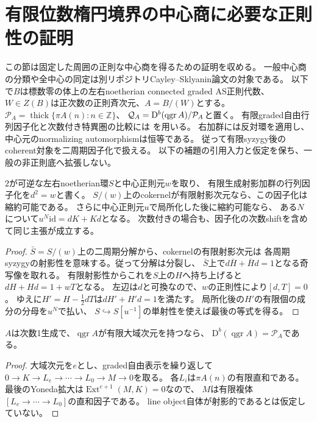 \section{有限位数楕円境界の中心商に必要な正則性の証明}
\label{CSBGsec:pair-finite-order-background}
この節は固定した周囲の正則な中心商を得るための証明を収める。
一般中心商の分類や全中心の同定は別リポジトリCayley--Sklyanin論文の対象である。
以下で$B$は標数零の体上の左右noetherian connected graded AS正則代数、
$W\in Z(B)$は正次数の正則斉次元、$A=B/(W)$とする。
$\mathcal P_A=\operatorname{thick}\{\pi A(n):n\in\mathbb Z\}$、
$\mathcal Q_A=\mathrm D^b(\operatorname{qgr} A)/\mathcal P_A$と置く。
有限graded自由行列因子化と次数付き特異圏の比較には
\cite[Theorems~4.7, 5.5]{CSBGCCKM}を用いる。
右加群には反対環を適用し、中心元のnormalizing automorphismは恒等である。
従って有限syzygy後のcoherent対象を二周期因子化で扱える。
以下の補題の引用入力と仮定を保ち、一般の非正則底へ拡張しない。
\begin{lemma}[有限射影因子化の縮約と分母払い]
\label{CSBGlem:gluing-contraction}
$2$が可逆な左右noetherian環$S$と中心正則元$w$を取り、
有限生成射影加群の行列因子化を$d^2=w$と書く。
$S/(w)$上のcokernelが有限射影次元なら、この因子化は縮約可能である。
さらに中心正則元$u$で局所化した後に縮約可能なら、
ある$N$について$u^N\mathrm{id}=dK+Kd$となる。
次数付きの場合も、因子化の次数shiftを含めて同じ主張が成立する。
\end{lemma}
\begin{proof}
$\bar S=S/(w)$上の二周期分解から、cokernelの有限射影次元は
各周期syzygyの射影性を意味する。従って分解は分裂し、
$\bar S$上で$d\bar H+\bar Hd=1$となる奇写像を取れる。
有限射影性からこれを$S$上の$H$へ持ち上げると
$dH+Hd=1+wT$となる。
左辺は$d$と可換なので、$w$の正則性により$[d,T]=0$。
ゆえに$H'=H-\frac12dT$は$dH'+H'd=1$を満たす。
局所化後の$H'$の有限個の成分の分母を$u^N$で払い、
$S\hookrightarrow S[u^{-1}]$の単射性を使えば最後の等式を得る。
\end{proof}

\begin{lemma}[有限大域次元からtwistsによる生成へ]
\label{CSBGlem:global-finite-to-perfect}
$A$は次数1生成で、$\operatorname{qgr}A$が有限大域次元を持つなら、
$\mathrm D^b(\operatorname{qgr}A)=\mathcal P_A$である。
\end{lemma}
\begin{proof}
大域次元を$e$とし、graded自由表示を繰り返して
$0\to K\to L_e\to\cdots\to L_0\to M\to0$を取る。
各$L_i$は$\pi A(n)$の有限直和である。
最後のYoneda拡大は$\operatorname{Ext}^{e+1}(M,K)=0$なので、
$M$は有限複体$[L_e\to\cdots\to L_0]$の直和因子である。
line object自体が射影的であるとは仮定していない。
\end{proof}


